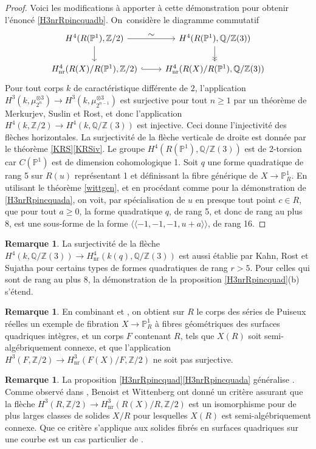 \documentclass[JEP,XML,SOM,Unicode,francais,published]{cedram}
\let\ts\textstyle
\theoremstyle{definition}
\newtheorem{rmk}[thm]{Remarque}
\newcommand{\Q}{\mathbb Q}
\newcommand{\Z}{\mathbb Z}
\renewcommand{\P}{\mathbb P}
\newcommand{\on}[1]{\operatorname{#1}}
\begin{document}
\begin{proof}
Voici les modifications à apporter à cette démonstration pour obtenir l'énoncé \eqref{H3nrRpincquadb}. On~considère le diagramme commutatif
\[
\begin{tikzcd}
H^4(R(\P^1),\Z/2) \arrow[r,"\ts \sim"] \arrow[d] & H^4(R(\P^1),\Q/\Z(3)) \arrow[d,->>] \\
H^4_{\on{nr}}(R(X)/R(\P^1),\Z/2) \arrow[r,hook] & H^4_{\on{nr}}(R(X)/R(\P^1),\Q/\Z(3))
\end{tikzcd}
\]
Pour tout corps $k$ de caractéristique différente de $2$, l'application $H^3(k,\mu_{2^n}^{\otimes 3})\to H^3(k,\mu_{2^{n-1}}^{\otimes 3})$ est surjective pour tout $n\geq 1$ par un théorème de Merkurjev, Suslin et Rost,
et donc l'application $H^4(k,\Z/2) \to H^4(k,\Q/\Z(3))$ est injective. Ceci donne l'injectivité des flèches horizontales.
La surjectivité de la flèche verticale de droite est donnée par le théorème \ref{KRS}\eqref{KRSiv}. Le groupe $H^4(R(\P^1),\Q/\Z(3))$ est de 2\nobreakdash-torsion car $C(\P^1)$ est de dimension cohomologique 1. Soit $q$ une forme quadratique de rang 5 sur $R(u)$ représentant 1 et définissant la fibre générique de $X \to \P^1_R$. En utilisant le théorème \ref{wittgen},
et en procédant comme pour la démonstration de \eqref{H3nrRpincquada}, on voit, par spécialisation de $u$ en presque tout point $c\in R$,
que pour tout $a\geq 0$, la forme quadratique
$q$, de rang 5, et donc de rang au plus 8, est une sous-forme de la forme $\langle \!\langle -1,-1,-1, u+a \rangle \!\rangle$, de rang 16.
\end{proof}
\begin{rmk}
La surjectivité de la flèche
$H^{4}(k,\Q/\Z(3)) \to H^{4}_{\on{nr}}(k(q), \Q/\Z(3))$
est aussi établie par Kahn, Rost et Sujatha pour certains types de formes quadratiques de rang $r>5$. Pour celles qui sont de rang au plus 8, la démonstration de la proposition \ref{H3nrRpincquad}(b) s'étend.
\end{rmk}

\begin{rmk}
En combinant \cite[Th.\,1.1]{benoist2026rationality} et \cite[Th.\,4.8]{colliot2024certaines}, on obtient sur $R$ le corps des séries
de Puiseux réelles un
exemple de fibration $X \to \P^1_{R}$ à fibres géométriques des surfaces quadriques intègres,
et un corps $F$ contenant $R$, tels que $X(R)$ soit semi-algébriquement connexe, et que
l'application $H^3(F,\Z/2) \to H^3_{\on{nr}}(F(X)/F,\Z/2)$
ne soit pas surjective.
\end{rmk}

\begin{rmk}
La proposition \ref{H3nrRpincquad}\eqref{H3nrRpincquada} généralise
\cite[Th.\,4.6]{colliot2024certaines}.
Comme observé dans \cite[Rem.\,4.7]{colliot2024certaines},
Benoist et Wittenberg ont donné un critère \cite[Prop.\,5.2]{benoist2020integral1}
assurant que la flèche $H^3(R,\Z/2) \to H^3_{\on{nr}}(R(X)/R,\Z/2)$
est un isomorphisme pour de plus larges classes
de solides $X/R$ pour lesquelles $X(R)$ est semi-algébriquement connexe.
Que ce critère s'applique aux solides fibrés en surfaces quadriques sur
une courbe est un cas particulier de
\cite[Th.\,8.1(i)]{benoist2020integral2}.
\end{rmk}
\end{document}
